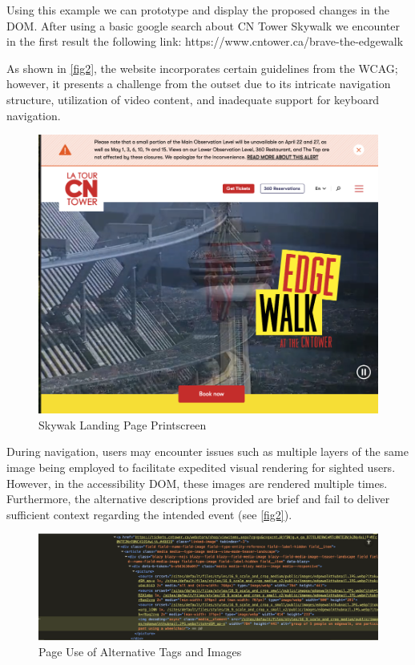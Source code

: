 \documentclass[conference]{IEEEtran}
\begin{document}
 Using this example we can prototype and display the proposed changes in the DOM. After using a basic google search about CN Tower Skywalk we encounter in the first result the following link:
 https://www.cntower.ca/brave-the-edgewalk

 As shown in \autoref{fig2}, the website incorporates certain guidelines from the WCAG; however, it presents a challenge from the outset due to its intricate navigation structure, utilization of video content, and inadequate support for keyboard navigation.

\begin{figure}[!t]
\centering
\includegraphics[width=\columnwidth]{images/1.png}
\caption{Skywak Landing Page Printscreen}
\label{fig2}
\end{figure}

During navigation, users may encounter issues such as multiple layers of the same image being employed to facilitate expedited visual rendering for sighted users. However, in the accessibility DOM, these images are rendered multiple times. Furthermore, the alternative descriptions provided are brief and fail to deliver sufficient context regarding the intended event (see \autoref{fig2}).

\begin{figure}[!t]
\centering
\includegraphics[width=\columnwidth]{images/2.png}
\caption{Page Use of Alternative Tags and Images}
\label{fig3}
\end{figure}
\end{document}
